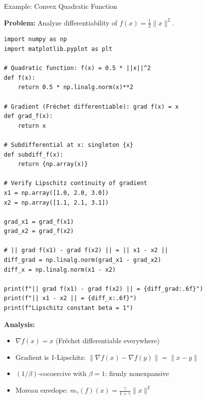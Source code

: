 \documentclass[aspectratio=169,10pt]{beamer}
\theoremstyle{definition}
\begin{document}
\begin{frame}[fragile]{Example: Convex Quadratic Function}

\textbf{Problem:} Analyze differentiability of $f(x) = \frac{1}{2}\|x\|^2$.

\vspace{0.3cm}

\begin{lstlisting}
import numpy as np
import matplotlib.pyplot as plt

# Quadratic function: f(x) = 0.5 * ||x||^2
def f(x):
    return 0.5 * np.linalg.norm(x)**2

# Gradient (Fréchet differentiable): grad f(x) = x
def grad_f(x):
    return x

# Subdifferential at x: singleton {x}
def subdiff_f(x):
    return {np.array(x)}

# Verify Lipschitz continuity of gradient
x1 = np.array([1.0, 2.0, 3.0])
x2 = np.array([1.1, 2.1, 3.1])

grad_x1 = grad_f(x1)
grad_x2 = grad_f(x2)

# || grad f(x1) - grad f(x2) || = || x1 - x2 ||
diff_grad = np.linalg.norm(grad_x1 - grad_x2)
diff_x = np.linalg.norm(x1 - x2)

print(f"|| grad f(x1) - grad f(x2) || = {diff_grad:.6f}")
print(f"|| x1 - x2 || = {diff_x:.6f}")
print(f"Lipschitz constant beta = 1")
\end{lstlisting}

\textbf{Analysis:}
\begin{itemize}
  \item $\nabla f(x) = x$ (Fréchet differentiable everywhere)
  \item Gradient is 1-Lipschitz: $\|\nabla f(x) - \nabla f(y)\| = \|x - y\|$
  \item $(1/\beta)$-cocoercive with $\beta = 1$: firmly nonexpansive
  \item Moreau envelope: $m_\gamma(f)(x) = \frac{\gamma}{1 + \gamma}\|x\|^2$
\end{itemize}

\end{frame}
\end{document}
